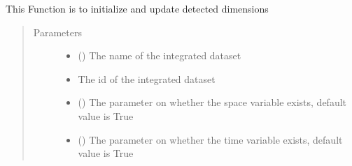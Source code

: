 \documentclass[letterpaper,10pt,english]{sphinxmanual}
\begin{document}
\begin{fulllineitems}
\begin{fulllineitems}
\label{\detokenize{AgentTools.GenericModelAgent:AgentTools.GenericModelAgent.ForcingDataFileGenerator.ForcingDataFileGenerator.check_dimensions_var}}
This Function is to initialize and update detected dimensions
\begin{quote}\begin{description}
\item[{Parameters}] \leavevmode\begin{itemize}
\item {} 
 () \textendash{} The name of the integrated dataset

\item {} 
 \textendash{} The id of the integrated dataset

\item {} 
 () \textendash{} The parameter on whether the space variable exists, default value is True

\item {} 
 () \textendash{} The parameter on whether the time variable exists, default value is True

\end{itemize}

\end{description}\end{quote}

\end{fulllineitems}



\end{fulllineitems}
\end{document}
